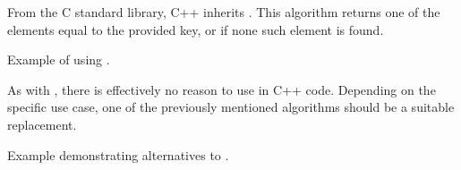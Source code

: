 From the C standard library, C++ inherits . This algorithm returns one of the elements equal to the provided key, or  if none such element is found.

\begin{box-note}
\footnotesize Example of using .
\tcblower
{}
\end{box-note}

As with , there is effectively no reason to use  in C++ code. Depending on the specific use case, one of the previously mentioned algorithms should be a suitable replacement.

\begin{box-note}
\footnotesize Example demonstrating alternatives to .
\tcblower
{}
\end{box-note}
